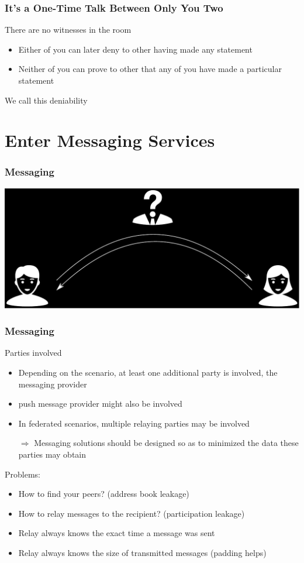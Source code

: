 \documentclass[aspectratio=169]{beamer}
\begin{document}
\begin{frame}
	\frametitle{It's a One-Time Talk Between Only You Two}
	There are no witnesses in the room
	\begin{itemize}
		\item Either of you can later deny to other having made any statement
		\item Neither of you can prove to other that any of you have made a particular statement
	\end{itemize}
	We call this \alert{deniability}
\end{frame}

\section{Enter Messaging Services}

\begin{frame}
	\frametitle{Messaging}
	\centering
	\includegraphics[width=.75\textwidth]{img/messaging.pdf}	
\end{frame}

\begin{frame}
	\frametitle{Messaging}
	Parties involved
	\begin{itemize}
		\item Depending on the scenario, at least one additional party is involved, the messaging provider
		\item push message provider might also be involved
		\item In federated scenarios, multiple relaying parties may be involved
		\item[$\Rightarrow$] Messaging solutions should be designed so as to minimized the data these parties may obtain
	\end{itemize}
	Problems:
	\begin{itemize}
		\item How to find your peers? (address book leakage)
		\item How to relay messages to the recipient? (participation leakage)
		\item Relay always knows the exact time a message was sent
		\item Relay always knows the size of transmitted messages (padding helps)
	\end{itemize}
\end{frame}
\end{document}
